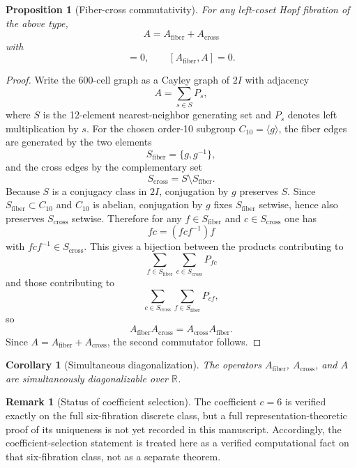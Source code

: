 \documentclass[12pt,a4paper]{article}
\newtheorem{proposition}{Proposition}
\newtheorem{corollary}{Corollary}
\theoremstyle{definition}
\newtheorem{remark}{Remark}
\begin{document}
\begin{proposition}[Fiber-cross commutativity]
\label{prop:fiber_cross_commute_exact}
For any left-coset Hopf fibration of the above type,
\begin{equation}
A=A_{\mathrm{fiber}}+A_{\mathrm{cross}}
\end{equation}
with
\begin{equation}
[A_{\mathrm{fiber}},A_{\mathrm{cross}}]=0,
\qquad
[A_{\mathrm{fiber}},A]=0.
\end{equation}
\end{proposition}

\begin{proof}
Write the 600-cell graph as a Cayley graph of $2I$ with adjacency
\[
A=\sum_{s\in S} P_s,
\]
where $S$ is the 12-element nearest-neighbor generating set and $P_s$ denotes
left multiplication by $s$.  For the chosen order-10 subgroup $C_{10}=\langle
g\rangle$, the fiber edges are generated by the two elements
\[
S_{\mathrm{fiber}}=\{g,g^{-1}\},
\]
and the cross edges by the complementary set
\[
S_{\mathrm{cross}}=S\setminus S_{\mathrm{fiber}}.
\]
Because $S$ is a conjugacy class in $2I$, conjugation by $g$ preserves $S$.
Since $S_{\mathrm{fiber}}\subset C_{10}$ and $C_{10}$ is abelian, conjugation
by $g$ fixes $S_{\mathrm{fiber}}$ setwise, hence also preserves
$S_{\mathrm{cross}}$ setwise.  Therefore for any $f\in S_{\mathrm{fiber}}$ and
$c\in S_{\mathrm{cross}}$ one has
\[
fc=(fcf^{-1})f
\]
with $fcf^{-1}\in S_{\mathrm{cross}}$.  This gives a bijection between the
products contributing to
\[
\sum_{f\in S_{\mathrm{fiber}}}\sum_{c\in S_{\mathrm{cross}}} P_{fc}
\]
and those contributing to
\[
\sum_{c\in S_{\mathrm{cross}}}\sum_{f\in S_{\mathrm{fiber}}} P_{cf},
\]
so
\[
A_{\mathrm{fiber}}A_{\mathrm{cross}}=A_{\mathrm{cross}}A_{\mathrm{fiber}}.
\]
Since $A=A_{\mathrm{fiber}}+A_{\mathrm{cross}}$, the second commutator follows.
\end{proof}

\begin{corollary}[Simultaneous diagonalization]
\label{cor:simul_diag_exact}
The operators $A_{\mathrm{fiber}}$, $A_{\mathrm{cross}}$, and $A$ are
simultaneously diagonalizable over $\mathbb{R}$.
\end{corollary}

\begin{remark}[Status of coefficient selection]
The coefficient $c=6$ is verified exactly on the full six-fibration discrete
class, but a full representation-theoretic proof of its uniqueness is not yet
recorded in this manuscript.  Accordingly, the coefficient-selection statement
is treated here as a verified computational fact on that six-fibration class,
not as a separate theorem.
\end{remark}
\end{document}
